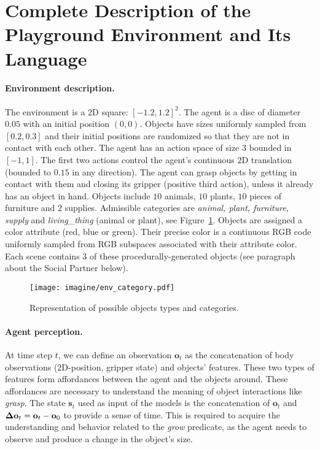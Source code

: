 \section{Complete Description of the Playground Environment and Its Language}
\label{sec:suppl_env_descr}

\paragraph{Environment description.} The environment is a $2$D square: $[-1.2,1.2]^2$. The agent is a disc of diameter $0.05$ with an initial position $(0,0)$. Objects have sizes uniformly sampled from $[0.2, 0.3]$ and their initial positions are randomized so that they are not in contact with each other. The agent has an action space of size $3$ bounded in $[-1,1]$. The first two actions control the agent's continuous $2$D translation (bounded to $0.15$ in any direction). The agent can grasp objects by getting in contact with them and closing its gripper (positive third action), unless it already has an object in hand. Objects include $10$ animals, $10$ plants, $10$ pieces of furniture and $2$ supplies. Admissible categories are \textit{animal, plant, furniture, supply} and \textit{living\_thing} (animal or plant), see Figure~\ref{fig:env_category}. Objects are assigned a color attribute (red, blue or green). Their precise color is a continuous RGB code uniformly sampled from  RGB subspaces associated with their attribute color. Each scene contains $3$ of these procedurally-generated objects (see paragraph about the Social Partner below).

 \begin{figure}[ht]
    \centering
        \texttt{[image: imagine/env\_category.pdf]}
         \caption{Representation of possible objects types and categories.}  
    \label{fig:env_category}
    \end{figure}

\paragraph{Agent perception.} At time step $t$, we can define an observation $\textbf{o}_t$ as the concatenation of body observations ($2$D-position, gripper state) and objects' features. These two types of features form affordances between the agent and the objects around. These affordances are necessary to understand the meaning of object interactions like \textit{grasp}. The state $\textbf{s}_t$ used as input of the models is the concatenation of $\textbf{o}_t$ and $\boldsymbol{\Delta}\textbf{o}_t = \textbf{o}_t-\textbf{o}_0$ to provide a sense of time. This is required to acquire the understanding and behavior related to the \textit{grow} predicate, as the agent needs to observe and produce a change in the object's size.

